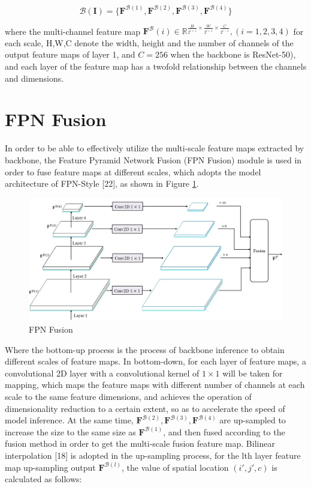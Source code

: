 \begin{equation}
\label{eq3}
  \mathcal{B}(\mathbf{I}) = \{ \mathbf{F}^{\mathcal{B}(1)}, \mathbf{F}^{\mathcal{B}(2)}, \mathbf{F}^{\mathcal{B}(3)}, \mathbf{F}^{\mathcal{B}(4)} \}
\end{equation}

where the multi-channel feature map $\mathbf{F}^\mathcal{B}(i) \in \mathbb{R}^{\frac{H}{2^{i+1}} \times \frac{W}{2^{i+1}} \times \frac{C}{2^{i-1}}},(i=1,2,3,4)$ for each scale, H,W,C denote the width, height and the number of channels of the output feature maps of layer 1, and $C=256$ when the backbone is ResNet-50), and each layer of the feature map has a twofold relationship between the channels and dimensions.

\section{FPN Fusion}

In order to be able to effectively utilize the multi-scale feature maps extracted by backbone, the Feature Pyramid Network Fusion (FPN Fusion) module is used in order to fuse feature maps at different scales, which adopts the model architecture of FPN-Style [22], as shown in Figure \ref{fig:fpn}.

\begin{figure}[htbp]
  \begin{center}
      \includegraphics[scale=0.4]{figure/fpn.jpg}
  \end{center}
  \caption{FPN Fusion}
  \label{fig:fpn}
\end{figure}

Where the bottom-up process is the process of backbone inference to obtain different scales of feature maps. In bottom-down, for each layer of feature maps, a convolutional 2D layer with a convolutional kernel of $1\times 1$ will be taken for mapping, which maps the feature maps with different number of channels at each scale to the same feature dimensions, and achieves the operation of dimensionality reduction to a certain extent, so as to accelerate the speed of model inference. At the same time, $\mathbf{F}^{\mathcal{B}(2)} ,\mathbf{F}^{\mathcal{B}(3)} ,\mathbf{F}^{\mathcal{B}(4)}$ are up-sampled to increase the size to the same size as $\mathbf{F}^{\mathcal{B}(1)}$, and then fused according to the fusion method in order to get the multi-scale fusion feature map. Bilinear interpolation [18] is adopted in the up-sampling process, for the lth layer feature map up-sampling output $\mathbf{F}^{\mathcal{B}(l)}$, the value of spatial location $(i',j',c)$ is calculated as follows:

